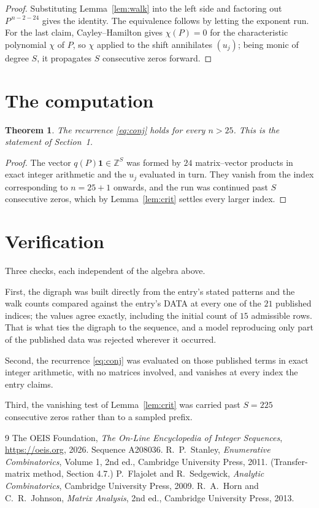 \documentclass[11pt,a4paper]{article}
\theoremstyle{plain}
\newtheorem{theorem}{Theorem}
\theoremstyle{definition}
\begin{document}
\begin{proof}
Substituting Lemma~\ref{lem:walk} into the left side and factoring out
$P^{\,n-2-24}$ gives the identity. The equivalence follows by letting the exponent
run. For the last claim, Cayley--Hamilton gives $\chi(P)=0$ for the characteristic
polynomial $\chi$ of $P$, so $\chi$ applied to the shift annihilates $(u_j)$; being monic of
degree $S$, it propagates $S$ consecutive zeros forward.
\end{proof}

\section{The computation}

\begin{theorem}
The recurrence \eqref{eq:conj} holds for every $n>25$. This is the statement of
Section~1.
\end{theorem}

\begin{proof}
The vector $q(P)\mathbf{1}\in\mathbb{Z}^{S}$ was formed by $24$ matrix--vector
products in exact integer arithmetic and the $u_j$ evaluated in turn. They vanish from the
index corresponding to $n=25+1$ onwards, and the run was continued past $S$ consecutive
zeros, which by Lemma~\ref{lem:crit} settles every larger index.
\end{proof}

\section{Verification}

Three checks, each independent of the algebra above.

First, the digraph was built directly from the entry's stated patterns and the walk counts
compared against the entry's DATA at every one of the $21$ published indices; the
values agree exactly, including the initial count of $15$ admissible rows. That is
what ties the digraph to the sequence, and a model reproducing only part of the published
data was rejected wherever it occurred.

Second, the recurrence \eqref{eq:conj} was evaluated on those published terms in exact
integer arithmetic, with no matrices involved, and vanishes at every index the entry claims.

Third, the vanishing test of Lemma~\ref{lem:crit} was carried past $S=225$ consecutive
zeros rather than to a sampled prefix.

\begin{thebibliography}{9}
 The OEIS Foundation, \emph{The On-Line Encyclopedia of Integer
Sequences}, \url{https://oeis.org}, 2026. Sequence A208036.
 R.~P.~Stanley, \emph{Enumerative Combinatorics}, Volume 1, 2nd ed.,
Cambridge University Press, 2011. (Transfer-matrix method, Section 4.7.)
 P.~Flajolet and R.~Sedgewick, \emph{Analytic Combinatorics}, Cambridge
University Press, 2009.
 R.~A.~Horn and C.~R.~Johnson, \emph{Matrix Analysis}, 2nd ed., Cambridge
University Press, 2013.
\end{thebibliography}
\end{document}
